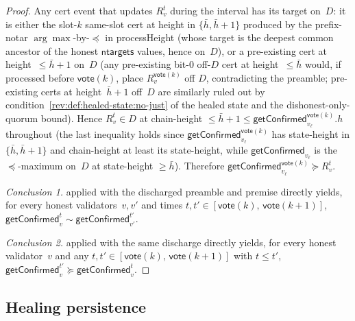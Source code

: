 \documentclass{article}
\newcommand{\ntargets}{\mathsf{ntargets}}
\newcommand{\vote}{\mathsf{vote}}
\newcommand{\comm}[1]{\bar{#1}}
\newcommand{\processHeight}{\textsf{processHeight}\xspace}
\newcommand{\getConfirmed}{\textsf{getConfirmed}\xspace}
\theoremstyle{plain}
\theoremstyle{definition}
\theoremstyle{remark}
\begin{document}
\begin{proof}
Any cert event that updates $R_v^t$ during the interval has its target on~$D$: it is either the slot-$k$ same-slot cert at height in $\{\comm{h}, \comm{h}+1\}$ produced by the prefix-notar $\arg\max$-by-$\preceq$ in \processHeight{} (whose target is the deepest common ancestor of the honest $\ntargets$ values, hence on~$D$), or a pre-existing cert at height~$\leq \comm{h}+1$ on~$D$ (any pre-existing bit-$0$ off-$D$ cert at height~$\leq \comm{h}$ would, if processed before $\vote(k)$, place $R_v^{\vote(k)}$ off $D$, contradicting the preamble; pre-existing certs at height~$\comm{h}+1$ off~$D$ are similarly ruled out by condition~\ref{rev:def:healed-state:no-just} of the healed state and the dishonest-only-quorum bound). Hence $R_v^t \in D$ at chain-height $\leq \comm{h}+1 \leq \getConfirmed_{v_\ell}^{\vote(k)}.h$ throughout (the last inequality holds since $\getConfirmed_{v_\ell}^{\vote(k)}$ has state-height in $\{\comm{h}, \comm{h}+1\}$ and chain-height at least its state-height, while $\getConfirmed_{v_\ell}$ is the $\preceq$-maximum on~$D$ at state-height $\geq \comm{h}$). Therefore $\getConfirmed_{v_\ell}^{\vote(k)} \succeq R_v^t$.

\emph{Conclusion 1.}
 applied with the discharged preamble and premise directly yields, for every honest validators~$v, v'$ and times $t, t' \in [\vote(k),\, \vote(k+1)]$, $\getConfirmed_v^t \sim \getConfirmed_{v'}^{t'}$.

\emph{Conclusion 2.}
 applied with the same discharge directly yields, for every honest validator~$v$ and any $t, t' \in [\vote(k),\, \vote(k+1)]$ with $t \leq t'$, $\getConfirmed_v^{t'} \succeq \getConfirmed_v^t$.
\end{proof}

\subsection{Healing persistence}\label{rev:sec:healing-persistence}
\end{document}
